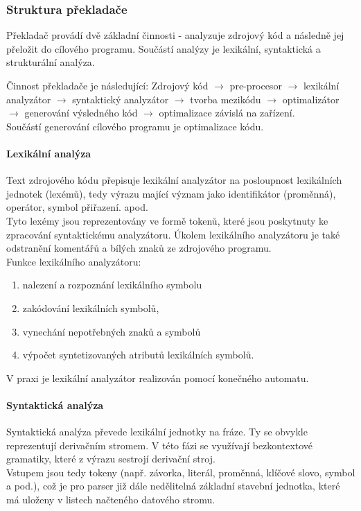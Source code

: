 \documentclass[10pt,a4paper]{article}
\begin{document}
\subsubsection{Struktura překladače}
Překladač provádí dvě základní činnosti - analyzuje zdrojový kód a následně jej přeložit do cílového programu. Součástí analýzy je lexikální, syntaktická a strukturální analýza.

Činnost překladače je následující: Zdrojový kód $\rightarrow$ pre-procesor $\rightarrow$ lexikální analyzátor $\rightarrow$ syntaktický analyzátor $\rightarrow$ tvorba mezikódu $\rightarrow$ optimalizátor $\rightarrow$ generování výsledného kód $\rightarrow$ optimalizace závislá na zařízení.\\
Součástí generování cílového programu je optimalizace kódu. 
\paragraph{Lexikální analýza}
Text zdrojového kódu přepisuje lexikální analyzátor na posloupnost lexikálních jednotek (lexémů), tedy výrazu mající význam jako identifikátor (proměnná), operátor, symbol přiřazení. apod.\\
Tyto lexémy jsou reprezentovány ve formě tokenů, které jsou poskytnuty ke zpracování syntaktickému analyzátoru. Úkolem lexikálního analyzátoru je také odstranění komentářů a bílých znaků ze zdrojového programu. \\
Funkce lexikálního analyzátoru:
\begin{enumerate}
\item nalezení a rozpoznání lexikálního symbolu
\item zakódování lexikálních symbolů,
\item vynechání nepotřebných znaků a symbolů
\item výpočet syntetizovaných atributů lexikálních symbolů.
\end{enumerate}
V praxi je lexikální analyzátor realizován pomocí konečného automatu.
\paragraph{Syntaktická analýza}
Syntaktická analýza převede lexikální jednotky na fráze. Ty se obvykle reprezentují derivačním stromem. V této fázi se využívají bezkontextové gramatiky, které z výrazu sestrojí derivační stroj.\\
Vstupem jsou tedy tokeny (např. závorka, literál, proměnná, klíčové slovo, symbol a pod.), což je pro parser již dále nedělitelná základní stavební jednotka, které má uloženy v listech načteného datového stromu.
\end{document}
